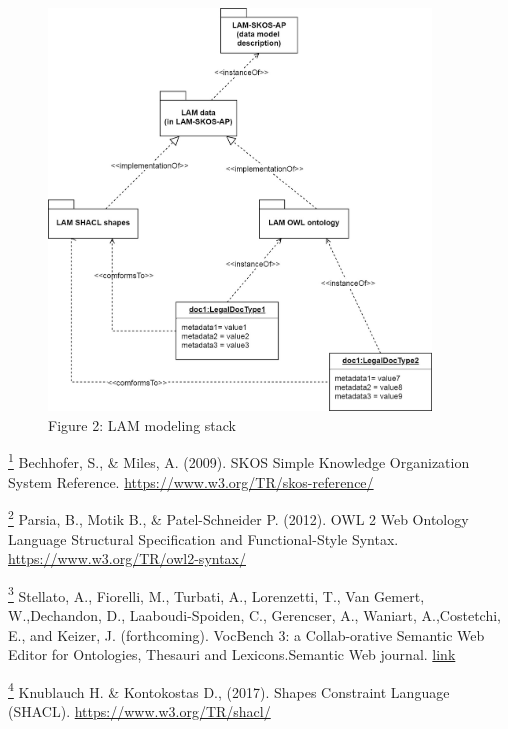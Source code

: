 \begin{figure}
\hypertarget{ont-req-modelling-stack__meta-model}{%
\centering
\includegraphics[width=4in,height=\textheight]{../../docs/LAM meta-model structure.jpg}
\caption{{Figure{ 2}: }LAM modeling
stack}\label{ont-req-modelling-stack__meta-model}
}
\end{figure}

\protect\hyperlink{fnsrc_1}{\textsuperscript{1}} Bechhofer, S., \&
Miles, A. (2009). SKOS Simple Knowledge Organization System Reference.
\url{https://www.w3.org/TR/skos-reference/}

\protect\hyperlink{fnsrc_2}{\textsuperscript{2}} Parsia, B., Motik B.,
\& Patel-Schneider P. (2012). OWL 2 Web Ontology Language Structural
Specification and Functional-Style Syntax.
\url{https://www.w3.org/TR/owl2-syntax/}

\protect\hyperlink{fnsrc_3}{\textsuperscript{3}} Stellato, A., Fiorelli,
M., Turbati, A., Lorenzetti, T., Van Gemert, W.,Dechandon, D.,
Laaboudi-Spoiden, C., Gerencser, A., Waniart, A.,Costetchi, E., and
Keizer, J. (forthcoming). VocBench 3: a Collab-orative Semantic Web
Editor for Ontologies, Thesauri and Lexicons.Semantic Web journal.
\href{http://www.semantic-web-journal.net/content/vocbench-3-collaborative-semantic-web-editor-ontologies-thesauri-and-lexicons-1}{link}

\protect\hyperlink{fnsrc_4}{\textsuperscript{4}} Knublauch H. \&
Kontokostas D., (2017). Shapes Constraint Language (SHACL).
\url{https://www.w3.org/TR/shacl/}

